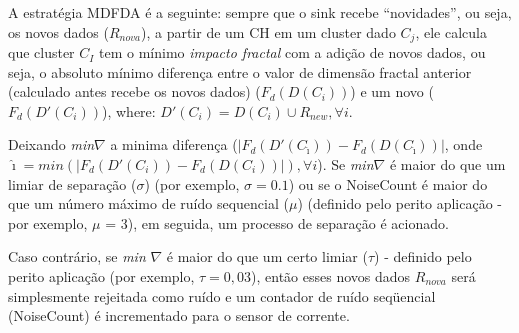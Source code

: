 \documentclass{acm_proc_article-sp}
\begin{document}
A estratégia MDFDA é a seguinte: 
sempre que o sink recebe ``novidades'', ou seja, os novos dados ($R_{nova}$),
a partir de um CH em um cluster dado $C_j$, ele calcula que cluster $C_I$
tem o mínimo \textit{impacto fractal} com a adição de novos dados, ou seja,
o absoluto mínimo diferença entre o valor de dimensão fractal anterior
(calculado antes recebe os novos dados) ($F_d(D(C_i))$) e um novo ($F_d(D'(C_i))$), where:
 $D'(C_i) = D(C_i) \cup R_{new}, \forall i$.
\vspace*{-.3cm}

Deixando {\it min}$\nabla$ a minima diferença ($|F_d(D'(C_{\hat{\imath}})) -
F_d(D(C_{\hat{\imath}}))|$, onde $\hat{\imath} = min(|F_d(D'(C_i)) -
F_d(D(C_i))|), \forall i$). Se {\it min}$\nabla$ é maior do que 
um limiar de separação ($\sigma$) (por exemplo, $\sigma = 0.1$) ou se
o NoiseCount é maior do que um número máximo de ruído sequencial ($\mu$)
(definido pelo perito aplicação - por exemplo, $\mu$ = 3),  em seguida, um
processo de separação é acionado.
\vspace*{-.3cm}

Caso contrário, se {\it min} $\nabla$ é maior do que um certo limiar ($\tau$)
- definido pelo perito aplicação (por exemplo, $\tau = 0,03$), então 
esses novos dados $R_{nova}$ será simplesmente rejeitada como ruído e 
um contador de ruído seqüencial (NoiseCount) é incrementado para o sensor
de corrente.
\vspace*{-.3cm}
\end{document}
